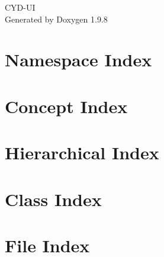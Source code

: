 \documentclass[twoside]{book}
\newcommand{\+}{\discretionary{\mbox{\scriptsize$\hookleftarrow$}}{}{}}
\newcommand{\clearemptydoublepage}{%
    \newpage{\pagestyle{empty}\cleardoublepage}%
  }
\begin{document}
  \raggedbottom
    \hypersetup{pageanchor=false,
                bookmarksnumbered=true,
                pdfencoding=unicode
               }
  \begin{titlepage}
  \vspace*{7cm}
  \begin{center}%
  {\Large CYD-\/\+UI}\\
  \vspace*{1cm}
  {\large Generated by Doxygen 1.9.8}\\
  \end{center}
  \end{titlepage}
  \clearemptydoublepage
  \tableofcontents
  \clearemptydoublepage
  \hypersetup{pageanchor=true}



\chapter{Namespace Index}

\chapter{Concept Index}

\chapter{Hierarchical Index}

\chapter{Class Index}

\chapter{File Index}

\end{document}
